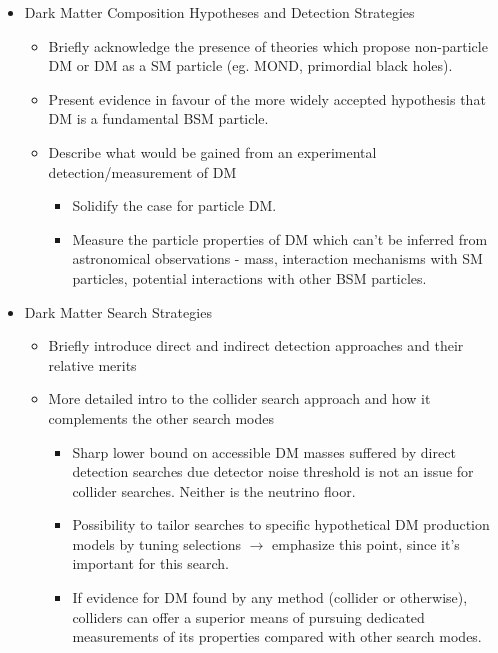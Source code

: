 \begin{description}
\begin{itemize}
\item Dark Matter Composition Hypotheses and Detection Strategies
\begin{itemize}
\item Briefly acknowledge the presence of theories which propose non-particle DM or DM as a SM particle (eg. MOND, primordial black holes).
\item Present evidence in favour of the more widely accepted hypothesis that DM is a fundamental BSM particle.
\item Describe what would be gained from an experimental detection/measurement of DM
\begin{itemize}
\item Solidify the case for particle DM.
\item Measure the particle properties of DM which can't be inferred from astronomical observations - mass, interaction mechanisms with SM particles, potential interactions with other BSM particles.
\end{itemize}
\end{itemize}

\item Dark Matter Search Strategies
\begin{itemize}
\item Briefly introduce direct and indirect detection approaches and their relative merits
\item More detailed intro to the collider search approach and how it complements the other search modes
\begin{itemize}
\item Sharp lower bound on accessible DM masses suffered by direct detection searches due detector noise threshold is not an issue for collider searches. Neither is the neutrino floor.
\item Possibility to tailor searches to specific hypothetical DM production models by tuning selections $\rightarrow$ emphasize this point, since it's important for this search.
\item If evidence for DM found by any method (collider or otherwise), colliders can offer a superior means of pursuing dedicated measurements of its properties compared with other search modes.
\end{itemize}
\end{itemize}


\end{itemize}
\end{description}
